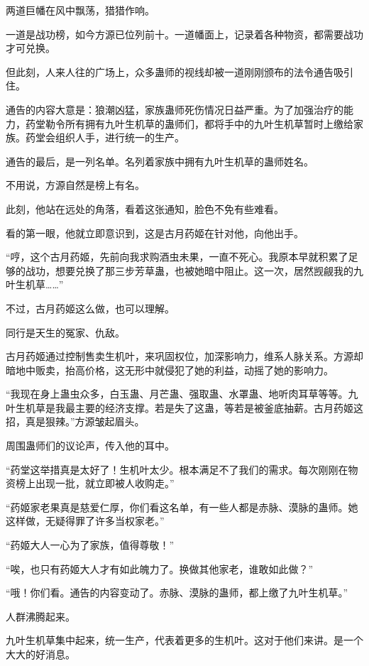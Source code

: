 
\begin{this_body}

两道巨幡在风中飘荡，猎猎作响。

一道是战功榜，如今方源已位列前十。一道幡面上，记录着各种物资，都需要战功才可兑换。

但此刻，人来人往的广场上，众多蛊师的视线却被一道刚刚颁布的法令通告吸引住。

通告的内容大意是：狼潮凶猛，家族蛊师死伤情况日益严重。为了加强治疗的能力，药堂勒令所有拥有九叶生机草的蛊师们，都将手中的九叶生机草暂时上缴给家族。药堂会组织人手，进行统一的生产。

通告的最后，是一列名单。名列着家族中拥有九叶生机草的蛊师姓名。

不用说，方源自然是榜上有名。

此刻，他站在远处的角落，看着这张通知，脸色不免有些难看。

看的第一眼，他就立即意识到，这是古月药姬在针对他，向他出手。

“哼，这个古月药姬，先前向我求购酒虫未果，一直不死心。我原本早就积累了足够的战功，想要兑换了那三步芳草蛊，也被她暗中阻止。这一次，居然觊觎我的九叶生机草……”

不过，古月药姬这么做，也可以理解。

同行是天生的冤家、仇敌。

古月药姬通过控制售卖生机叶，来巩固权位，加深影响力，维系人脉关系。方源却暗地中贩卖，抬高价格，这无形中就侵犯了她的利益，动摇了她的影响力。

“我现在身上蛊虫众多，白玉蛊、月芒蛊、强取蛊、水罩蛊、地听肉耳草等等。九叶生机草是我最主要的经济支撑。若是失了这蛊，等若是被釜底抽薪。古月药姬这招，真是狠辣。”方源皱起眉头。

周围蛊师们的议论声，传入他的耳中。

“药堂这举措真是太好了！生机叶太少。根本满足不了我们的需求。每次刚刚在物资榜上出现一批，就立即被人收购走。”

“药姬家老果真是慈爱仁厚，你们看这名单，有一些人都是赤脉、漠脉的蛊师。她这样做，无疑得罪了许多当权家老。”

“药姬大人一心为了家族，值得尊敬！”

“唉，也只有药姬大人才有如此魄力了。换做其他家老，谁敢如此做？”

“哦！你们看。通告的内容变动了。赤脉、漠脉的蛊师，都上缴了九叶生机草。”

人群沸腾起来。

九叶生机草集中起来，统一生产，代表着更多的生机叶。这对于他们来讲。是一个大大的好消息。


\end{this_body}
